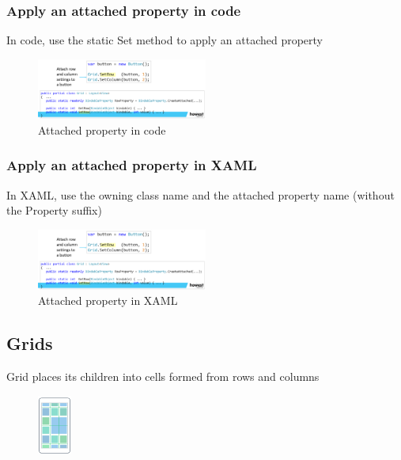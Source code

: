 \documentclass{article}
\begin{document}
\subsubsection{Apply an attached property in code}

In code, use the static Set method to apply an attached property

\begin{figure}[H]
    \centering
    \includegraphics[width=0.5\textwidth]{xaml-attachedproperties3.png}
    \caption{Attached property in code}
\end{figure}

\subsubsection{Apply an attached property in XAML}

In XAML, use the owning class name and the attached property name (without the Property suffix)

\begin{figure}[H]
    \centering
    \includegraphics[width=0.5\textwidth]{xaml-attachedproperties3.png}
    \caption{Attached property in XAML}
\end{figure}

\subsection{Grids}

Grid places its children into cells formed from rows and columns

\begin{figure}[H]
    \centering
    \includegraphics[width=0.1\textwidth]{xaml-grid1.png}
    \caption{}
\end{figure}
\end{document}
